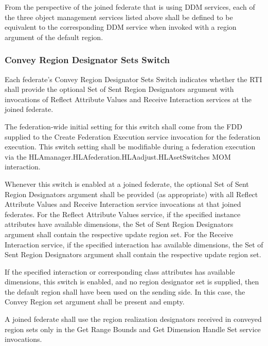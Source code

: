 \begin{compactstdpage}

    From the perspective of the joined federate that is using DDM services, each of the three object management services listed above shall be defined to be equivalent to the corresponding DDM service when invoked with a region argument of the default region.

    \subsubsection{Convey Region Designator Sets Switch}

    Each federate's Convey Region Designator Sets Switch indicates whether the RTI shall provide the optional Set of Sent Region Designators argument with invocations of Reflect Attribute Values \rtiinitiated{} and Receive Interaction \rtiinitiated{} services at the joined federate.

    The federation-wide initial setting for this switch shall come from the FDD supplied to the Create Federation Execution service invocation for the federation execution. This switch setting shall be modifiable during a federation execution via the HLAmanager.HLAfederation.HLAadjust.HLAsetSwitches MOM interaction.

    Whenever this switch is enabled at a joined federate, the optional Set of Sent Region Designators argument shall be provided (as appropriate) with all Reflect Attribute Values \rtiinitiated{} and Receive Interaction \rtiinitiated{} service invocations at that joined federates. For the Reflect Attribute Values \rtiinitiated{} service, if the specified instance attributes have available dimensions, the Set of Sent Region Designators argument shall contain the respective update region set. For the Receive Interaction \rtiinitiated{} service, if the specified interaction has available dimensions, the Set of Sent Region Designators argument shall contain the respective update region set.

    If the specified interaction or corresponding class attributes has available dimensions, this switch is enabled, and no region designator set is supplied, then the default region shall have been used on the sending side. In this case, the Convey Region set argument shall be present and empty.

    A joined federate shall use the region realization designators received in conveyed region sets only in the Get Range Bounds and Get Dimension Handle Set service invocations.


\end{compactstdpage}

